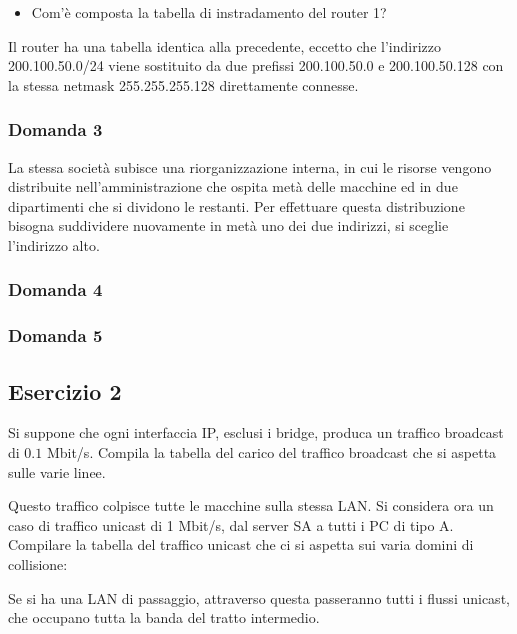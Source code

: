 \documentclass{article}
\numberwithin{equation}{subsection}
\begin{document}
\begin{itemize}
    \item Com'è composta la tabella di instradamento del router 1?
\end{itemize}

Il router ha una tabella identica alla precedente, eccetto che l'indirizzo 200.100.50.0/24 viene sostituito da due prefissi 200.100.50.0 e 
200.100.50.128 con la stessa netmask 255.255.255.128 direttamente connesse. 

\subsubsection*{Domanda 3}

La stessa società subisce una riorganizzazione interna, in cui le risorse vengono distribuite nell'amministrazione che ospita metà delle 
macchine ed in due dipartimenti che si dividono le restanti. Per effettuare questa distribuzione bisogna suddividere nuovamente in metà  
uno dei due indirizzi, si sceglie l'indirizzo alto. 


\subsubsection*{Domanda 4}

\subsubsection*{Domanda 5}


\subsection*{Esercizio 2}



Si suppone che ogni interfaccia IP, esclusi i bridge, produca un traffico broadcast di $0.1$ Mbit/s. Compila la tabella del carico del traffico broadcast che 
si aspetta sulle varie linee. 


Questo traffico colpisce tutte le macchine sulla stessa LAN. Si considera ora un caso di traffico unicast di 1 Mbit/s, dal server SA a 
tutti i PC di tipo A. Compilare la tabella del traffico unicast che ci si aspetta sui varia domini di collisione:


Se si ha una LAN di passaggio, attraverso questa passeranno tutti i flussi unicast, che occupano tutta la banda del tratto intermedio. 
\end{document}
